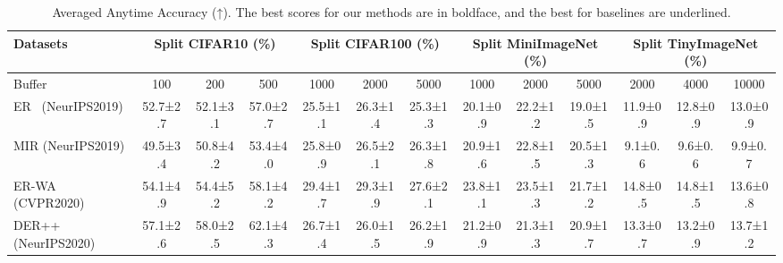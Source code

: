 \begin{table}[t]\small
\renewcommand\tabcolsep{2pt}
\centering
\caption{Averaged Anytime Accuracy (↑). The best scores for our methods are in boldface, and the best for baselines are underlined.}
\vspace{-2ex}
\label{tableaaa}
\begin{tabular}{l|ccc|ccc|ccc|ccc}
\hline
Datasets & \multicolumn{3}{c|}{Split CIFAR10 (\%)} & \multicolumn{3}{c|}{Split CIFAR100 (\%)}& \multicolumn{3}{c|}{Split MiniImageNet (\%)} & \multicolumn{3}{c}{Split TinyImageNet (\%)}\\ \hline
Buffer & \multicolumn{1}{c|}{100} & \multicolumn{1}{c|}{200} & \multicolumn{1}{c|}{500} & \multicolumn{1}{c|}{1000}    & \multicolumn{1}{c|}{2000} & \multicolumn{1}{c|}{5000} & \multicolumn{1}{c|}{1000} & \multicolumn{1}{c|}{2000}     &\multicolumn{1}{c|}{5000} & \multicolumn{1}{c|}{2000} & \multicolumn{1}{c|}{4000} & 10000     \\ \hline
ER~\cite{rolnick2019experience} (NeurIPS2019) & 52.7\scriptsize±2.7& 52.1\scriptsize±3.1                 & 57.0\scriptsize±2.7                 & 25.5\scriptsize±1.1                  & 26.3\scriptsize±1.4                  & 25.3\scriptsize±1.3 & 20.1\scriptsize±0.9                   & 22.2\scriptsize±1.2                  & 19.0\scriptsize±1.5 & 11.9\scriptsize±0.9                   & 12.8\scriptsize±0.9                  & 13.0\scriptsize±0.9\\
MIR (NeurIPS2019)& 49.5\scriptsize±3.4& 50.8\scriptsize±4.2                 & 53.4\scriptsize±4.0                 & 25.8\scriptsize±0.9                  & 26.5\scriptsize±2.1                  & 26.3\scriptsize±1.8 & 20.9\scriptsize±1.6                   & 22.8\scriptsize±1.5                  & 20.5\scriptsize±1.3 & 9.1\scriptsize±0.6                   & 9.6\scriptsize±0.6                  & 9.9\scriptsize±0.7\\
ER-WA~\cite{zhao2020maintaining} (CVPR2020)& 54.1\scriptsize±4.9& 54.4\scriptsize±5.2                 & 58.1\scriptsize±4.2                 & 29.4\scriptsize±1.7                  & 29.3\scriptsize±1.9                  & 27.6\scriptsize±2.1 & 23.8\scriptsize±1.1                   & 23.5\scriptsize±1.3                  & 21.7\scriptsize±1.2 & 14.8\scriptsize±0.5                   & 14.8\scriptsize±1.5                  & 13.6\scriptsize±0.8\\
DER++~\cite{buzzega2020dark} (NeurIPS2020)& 57.1\scriptsize±2.6& 58.0\scriptsize±2.5                 & 62.1\scriptsize±4.3                 & 26.7\scriptsize±1.4                  & 26.0\scriptsize±1.5                  & 26.2\scriptsize±1.9 & 21.2\scriptsize±0.9                   & 21.3\scriptsize±1.3                  & 20.9\scriptsize±1.7 & 13.3\scriptsize±0.7                   & 13.2\scriptsize±0.9                  & 13.7\scriptsize±1.2\\

\end{tabular}
\end{table}
